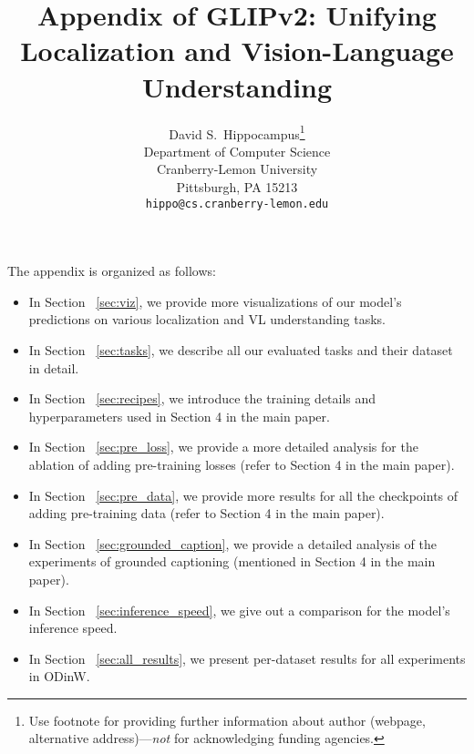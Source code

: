 \documentclass{article}
\title{Appendix of GLIPv2: Unifying Localization and Vision-Language Understanding
}
\author{David S.~Hippocampus\thanks{Use footnote for providing further information
    about author (webpage, alternative address)---\emph{not} for acknowledging
    funding agencies.} \\
  Department of Computer Science\\
  Cranberry-Lemon University\\
  Pittsburgh, PA 15213 \\
  \texttt{hippo@cs.cranberry-lemon.edu} \\
}
\begin{document}
\maketitle




\newcommand\blfootnote[1]{\begingroup
  \renewcommand\thefootnote{}\footnote{#1}\addtocounter{footnote}{-1}\endgroup
}
\newcommand{\dyground}{GLIP-T (A)\xspace}
\newcommand{\dyheadcoco}{DyHead {{- COCO}}\xspace}
\newcommand{\dyheadobj}{DyHead\xspace}

\newcommand{\objfive}{Object365\xspace}

\newcommand{\oura}{GLIP-T (B)\xspace}
\newcommand{\ourb}{GLIP-T (C)\xspace}
\newcommand{\ourtiny}{GLIP-T\xspace}

\newcommand{\ourd}{GLIP-L\xspace}
\newcommand{\ourlarge}{GLIP-L\xspace}


\newcommand{\objsuffix}{\hspace{7pt} w/ O365\xspace}
\newcommand{\goldgsuffix}{\hspace{7pt} w/ GoldG\xspace}
\newcommand{\goldg}{GoldG\xspace}
\newcommand{\goldgfull}{GoldG+\xspace}


The appendix is organized as follows:

\begin{itemize} 
\item In Section ~\ref{sec:viz}, we provide more visualizations of our model's predictions on various localization and VL understanding tasks. 
\item In Section ~\ref{sec:tasks}, we describe all our evaluated tasks and their dataset in detail. 
\item In Section ~\ref{sec:recipes}, we introduce the training details and hyperparameters used in Section 4 in the main paper. 
\item In Section ~\ref{sec:pre_loss}, we provide a more detailed analysis for the ablation of adding pre-training losses (refer to Section 4 in the main paper). 
\item In Section ~\ref{sec:pre_data}, we provide more results for all the checkpoints of adding pre-training data (refer to Section 4 in the main paper).  
\item In Section ~\ref{sec:grounded_caption}, we provide a detailed analysis of the experiments of grounded captioning (mentioned in Section 4 in the main paper).
\item In Section ~\ref{sec:inference_speed}, we give out a comparison for the model's inference speed. 
\item In Section ~\ref{sec:all_results}, we present per-dataset results for all experiments in ODinW. 

\end{itemize}
\end{document}

